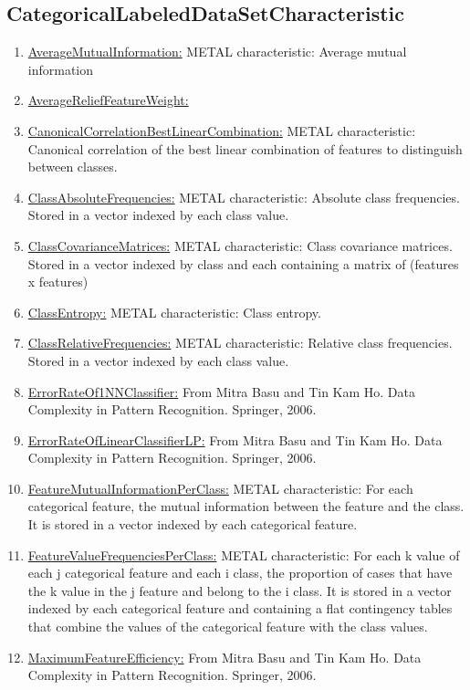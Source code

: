 \documentclass[a4paper,12pt, english]{article}
\begin{document}
\subsection{CategoricalLabeledDataSetCharacteristic}

	\begin{enumerate}
	\item \underline{AverageMutualInformation:} METAL characteristic: Average mutual information 
	\item \underline{AverageReliefFeatureWeight:}
	\item \underline{CanonicalCorrelationBestLinearCombination:} METAL characteristic: Canonical correlation of the best linear combination of features to distinguish between classes.
	\item \underline{ClassAbsoluteFrequencies:} METAL characteristic: Absolute class frequencies. Stored in a vector indexed by each class value.
	\item \underline{ClassCovarianceMatrices:} METAL characteristic: Class covariance matrices. Stored in a vector indexed by class and each containing a matrix of (features x features)
	\item \underline{ClassEntropy:}  METAL characteristic: Class entropy.
	\item \underline{ClassRelativeFrequencies:} METAL characteristic: Relative class frequencies. Stored in a vector indexed by each class value.
	\item \underline{ErrorRateOf1NNClassifier:}  From Mitra Basu and Tin Kam Ho. Data Complexity in Pattern Recognition. Springer, 2006.
	\item \underline{ErrorRateOfLinearClassifierLP:} From Mitra Basu and Tin Kam Ho. Data Complexity in Pattern Recognition. Springer, 2006.
	\item \underline{FeatureMutualInformationPerClass:} METAL characteristic: For each categorical feature, the mutual information between the feature and the class. It is stored in a vector indexed by each categorical feature.
	\item \underline{FeatureValueFrequenciesPerClass:} METAL characteristic: For each k value of each j categorical feature and each i class, the proportion of cases that have the k value in the j feature and belong to the i class. It is stored in a vector indexed by each categorical feature and containing a flat contingency tables that combine the values of the categorical feature with the class values. 
	\item \underline{MaximumFeatureEfficiency:} From Mitra Basu and Tin Kam Ho. Data Complexity in Pattern Recognition. Springer, 2006.

\end{enumerate}
\end{document}
